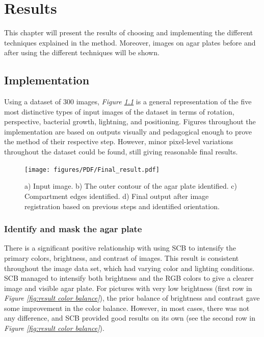 
\chapter{Results}
\label{cha:results}
This chapter will present the results of choosing and implementing the different techniques explained in the method. Moreover, images on agar plates before and after using the different techniques will be shown. 

\section{Implementation}
Using a dataset of 300 images, \textit{Figure \ref{fig:result final}} is a general representation of the five most distinctive types of input images of the dataset in terms of rotation, perspective, bacterial growth, lightning, and positioning. Figures throughout the implementation are based on outputs visually and pedagogical enough to prove the method of their respective step. However, minor pixel-level variations throughout the dataset could be found, still giving reasonable final results. 

\begin{figure}[H]
    \centering
     \texttt{[image: figures/PDF/Final\_result.pdf]}
        \caption{a) Input image. b) The outer contour of the agar plate identified. c) Compartment edges identified. d) Final output after image registration based on previous steps and identified orientation.}
    \label{fig:result final}
\end{figure}

\subsection{Identify and mask the agar plate}
\noindent There is a significant positive relationship with using SCB to intensify the primary colors, brightness, and contrast of images. This result is consistent throughout the image data set, which had varying color and lighting conditions. SCB managed to intensify both brightness and the RGB colors to give a clearer image and visible agar plate. For pictures with very low brightness (first row in \textit{Figure \ref{fig:result color balance}}), the prior balance of brightness and contrast gave some improvement in the color balance. However, in most cases, there was not any difference, and SCB provided good results on its own (see the second row in \textit{Figure \ref{fig:result color balance}}). 


